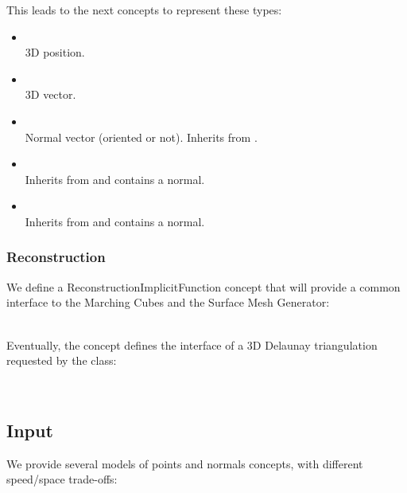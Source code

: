 This leads to the next concepts to represent these types:

\begin{itemize}
\item {} \\
3D position.
\item {} \\
3D vector.
\item {} \\
Normal vector (oriented or not). Inherits from .
\item {} \\
Inherits from  and contains a  normal.
\item {} \\
Inherits from  and contains a  normal.
\end{itemize}

\subsubsection{Reconstruction}

We define a ReconstructionImplicitFunction concept that will provide
a common interface to the Marching Cubes and the Surface Mesh Generator:

  \\

Eventually, the  concept defines the interface of a 3D Delaunay triangulation requested by the  class:

  \\


\subsection{Input}

We provide several models of points and normals concepts, with different speed/space trade-offs:

